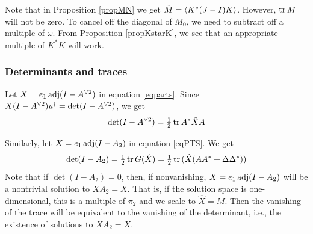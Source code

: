 Note that in Proposition \ref{propMN} we get $\tilde M=\avg K^*(J-I)K.$. However, ${\rm tr}\, \tilde M$ will not be zero. To cancel off the diagonal of $M_0$, we need to subtract off a multiple of $\omega$. 
From Proposition \ref{propKstarK}, we see that an appropriate multiple of $K^*K$ will work.


\subsubsection{Determinants and traces}
\label{sec:7.1.4.2}

Let $X=e_1\,{\rm adj}(I-{A}^{\vee 2})$ in equation \eqref{eqparts}. Since $X(I-\spow{A}{2})\dg  u.=\det(I-\spow{A}{2})$, we get
$$ 
  \det(I-{A}^{\vee 2})=\tfrac{1}{2}\,{\rm tr}\, {A}^*{\hat X}{A}
$$

Similarly, let $X=e_1\,{\rm adj}(I-A_2)$ in equation \eqref{eqPTS}. 
We get
$$ 
  \det(I-A_2)=\tfrac{1}{2}\,{\rm tr}\, G(\hat X)
	=\tfrac{1}{2}\,{\rm tr}\,(\hat X(AA^*+ \Delta\Delta^*))
$$
Note that if $\det(I-A_2)=0$, then, if nonvanishing, $X=e_1\,{\rm adj}(I-A_2)$ will be a nontrivial solution to
$XA_2=X$. 
That is, if the solution space is one-dimensional, this is a multiple of $\pi_2$ and we scale to $\hat X=M$.
Then the vanishing of the trace will be equivalent to the vanishing of the determinant, i.e., the existence of solutions to $XA_2=X$.
